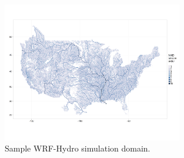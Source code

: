 \begin{figure}
\includegraphics[width=0.7\textwidth]{figures/hydro-map}
\vspace{-36pt}
\caption{Sample WRF-Hydro simulation domain.}
\end{figure}
%




